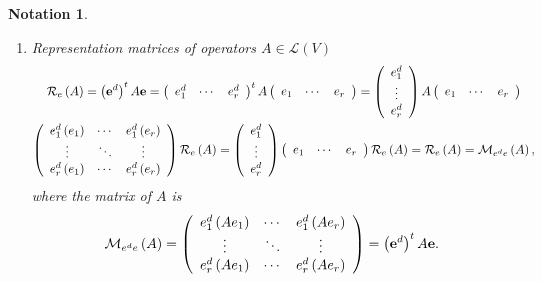 \documentclass[aps,preprint]{revtex4}%
\newtheorem{notation}[theorem]{Notation}
\begin{document}
\begin{notation}
\begin{enumerate}
\item Representation matrices of operators $A\in\mathcal{L}\left(  V\right)
$
\begin{gather}
\mathcal{R}_{e}\left(  A\right)  =\left(  \mathbf{e}^{d}\right)
^{t}A\mathbf{e}=\left(
\begin{array}
[c]{ccc}%
e_{1}^{d} & \cdots & e_{r}^{d}%
\end{array}
\right)  ^{t}A\left(
\begin{array}
[c]{ccc}%
e_{1} & \cdots & e_{r}%
\end{array}
\right)  =\left(
\begin{array}
[c]{c}%
e_{1}^{d}\\
\vdots\\
e_{r}^{d}%
\end{array}
\right)  A\left(
\begin{array}
[c]{ccc}%
e_{1} & \cdots & e_{r}%
\end{array}
\right) \\
\left(
\begin{array}
[c]{ccc}%
e_{1}^{d}\left(  e_{1}\right)  & \cdots & e_{1}^{d}\left(  e_{r}\right) \\
\vdots & \ddots & \vdots\\
e_{r}^{d}\left(  e_{1}\right)  & \cdots & e_{r}^{d}\left(  e_{r}\right)
\end{array}
\right)  \mathcal{R}_{e}\left(  A\right)  =\left(
\begin{array}
[c]{c}%
e_{1}^{d}\\
\vdots\\
e_{r}^{d}%
\end{array}
\right)  \left(
\begin{array}
[c]{ccc}%
e_{1} & \cdots & e_{r}%
\end{array}
\right)  \mathcal{R}_{e}\left(  A\right)  =\mathcal{R}_{e}\left(  A\right)
=\mathcal{M}_{e^{d}e}\left(  A\right)  ,
\end{gather}
where the matrix of $A$ is
\begin{equation}
\mathcal{M}_{e^{d}e}\left(  A\right)  =\left(
\begin{array}
[c]{ccc}%
e_{1}^{d}\left(  Ae_{1}\right)  & \cdots & e_{1}^{d}\left(  Ae_{r}\right) \\
\vdots & \ddots & \vdots\\
e_{r}^{d}\left(  Ae_{1}\right)  & \cdots & e_{r}^{d}\left(  Ae_{r}\right)
\end{array}
\right)  =\left(  \mathbf{e}^{d}\right)  ^{t}A\mathbf{e.}%
\end{equation}



\end{enumerate}
\end{notation}
\end{document}
